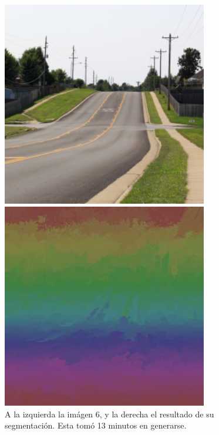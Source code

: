 \documentclass[letterpaper,11pt]{article} %
\begin{document}
      \begin{figure}[H]
        \centering
        \begin{minipage}{0.4\textwidth}
          \includegraphics[width=0.8\textwidth]{images/image_6}
        \end{minipage}
        \begin{minipage}{0.4\textwidth}
          \includegraphics[width=0.8\textwidth]{images/result_image6}
        \end{minipage}
        \caption{A la izquierda la imágen 6, y la derecha el resultado de su segmentación. Esta tomó 13 minutos en generarse.}
      \end{figure}
\end{document}
